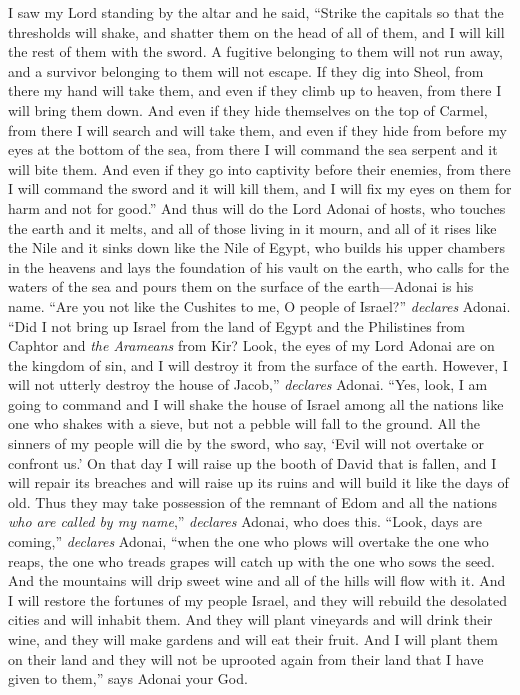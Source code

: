 \begin{biblechapter} %
 I saw my Lord standing by the altar and he said, “Strike the capitals so that the thresholds will shake, and shatter them on the head of all of them, and I will kill the rest of them with the sword. A fugitive belonging to them will not run away, and a survivor belonging to them will not escape.
\verse If they dig into Sheol, from there my hand will take them, and even if they climb up to heaven, from there I will bring them down.
\verse And even if they hide themselves on the top of Carmel, from there I will search and will take them, and even if they hide from before my eyes at the bottom of the sea, from there I will command the sea serpent and it will bite them.
\verse And even if they go into captivity before their enemies, from there I will command the sword and it will kill them, and I will fix my eyes on them for harm and not for good.”
\verse And thus will do the Lord Adonai of hosts, who touches the earth and it melts, and all of those living in it mourn, and all of it rises like the Nile and it sinks down like the Nile of Egypt,
\verse who builds his upper chambers in the heavens and lays the foundation of his vault on the earth, who calls for the waters of the sea and pours them on the surface of the earth—Adonai is his name.
\verse “Are you not like the Cushites to me, O people of Israel?” \textit{declares} Adonai. “Did I not bring up Israel from the land of Egypt and the Philistines from Caphtor and \textit{the Arameans} from Kir?
\verse Look, the eyes of my Lord Adonai are on the kingdom of sin, and I will destroy it from the surface of the earth. However, I will not utterly destroy the house of Jacob,” \textit{declares} Adonai.
\verse “Yes, look, I am going to command and I will shake the house of Israel among all the nations like one who shakes with a sieve, but not a pebble will fall to the ground.
\verse All the sinners of my people will die by the sword, who say, ‘Evil will not overtake or confront us.’
 On that day I will raise up the booth of David that is fallen, and I will repair its breaches and will raise up its ruins and will build it like the days of old.
\verse Thus they may take possession of the remnant of Edom and all the nations \textit{who are called by my name},” \textit{declares} Adonai, who does this.
\verse “Look, days are coming,” \textit{declares} Adonai, “when the one who plows will overtake the one who reaps, the one who treads grapes will catch up with the one who sows the seed. And the mountains will drip sweet wine and all of the hills will flow with it.
\verse And I will restore the fortunes of my people Israel, and they will rebuild the desolated cities and will inhabit them. And they will plant vineyards and will drink their wine, and they will make gardens and will eat their fruit.
\verse And I will plant them on their land and they will not be uprooted again from their land that I have given to them,” says Adonai your God.
\end{biblechapter}

